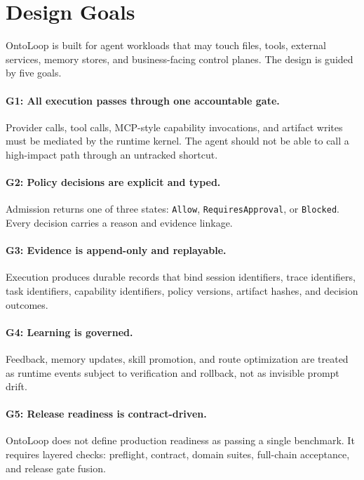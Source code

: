 \documentclass[11pt]{article}
\begin{document}
\section{Design Goals}

OntoLoop is built for agent workloads that may touch files, tools, external
services, memory stores, and business-facing control planes. The design is guided
by five goals.

\paragraph{G1: All execution passes through one accountable gate.}
Provider calls, tool calls, MCP-style capability invocations, and artifact writes
must be mediated by the runtime kernel. The agent should not be able to call a
high-impact path through an untracked shortcut.

\paragraph{G2: Policy decisions are explicit and typed.}
Admission returns one of three states: \texttt{Allow}, \texttt{RequiresApproval},
or \texttt{Blocked}. Every decision carries a reason and evidence linkage.

\paragraph{G3: Evidence is append-only and replayable.}
Execution produces durable records that bind session identifiers, trace identifiers,
task identifiers, capability identifiers, policy versions, artifact hashes, and
decision outcomes.

\paragraph{G4: Learning is governed.}
Feedback, memory updates, skill promotion, and route optimization are treated as
runtime events subject to verification and rollback, not as invisible prompt drift.

\paragraph{G5: Release readiness is contract-driven.}
OntoLoop does not define production readiness as passing a single benchmark. It
requires layered checks: preflight, contract, domain suites, full-chain acceptance,
and release gate fusion.
\end{document}

